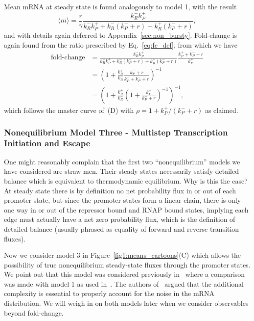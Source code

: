 Mean mRNA at steady state is found analogously to model 1, with the result
\begin{equation}
\langle m\rangle = \frac{r}{\gamma}
        \frac{k_R^- k_P^+}
        {k_R^- k_P^+ + k_R^- (k_P^- + r) + k_R^+ (k_P^- + r)},
\label{eq:model2_meanm}
\end{equation}
and with details again deferred to Appendix~\ref{sec:non_bursty}.
Fold-change is again found from the ratio prescribed by Eq.~\ref{eq:fc_def}, from
which we have
\begin{align}
\text{fold-change}
&=      \frac{k_R^- k_P^+}
        {k_R^- k_P^+ + k_R^- (k_P^- + r) + k_R^+ (k_P^- + r)}
        \frac{k_P^+ + k_P^- + r}{k_P^+}
\\
&=      \left(1 + \frac{k_R^+}{k_R^-}
                \frac{k_P^- + r}{k_P^+ + k_P^- + r}
        \right)^{-1}
\\
&=      \left(1 + \frac{k_R^+}{k_R^-}
        \left(1 + \frac{k_P^+}{k_P^- + r}\right)^{-1}
        \right)^{-1},
\end{align}
which follows the master curve of~(D) with $\rho = 1 +
k_P^+/(k_P^- + r)$ as claimed.

\subsubsection{Nonequilibrium Model Three - Multistep Transcription Initiation
and Escape}
One might reasonably complain that the first two ``nonequilibrium'' models we
have considered are straw men. Their steady states necessarily satisfy detailed
balance which is equivalent to thermodynamic equilibrium. Why is this the case?
At steady state there is by definition no net probability flux in or out of each
promoter state, but since the promoter states form a linear chain, there is only
one way in or out of the repressor bound and RNAP bound states, implying each
edge must actually have a net zero probability flux, which is the definition of
detailed balance (usually phrased as equality of forward and reverse transition
fluxes).

Now we consider model 3 in Figure~\ref{fig1:means_cartoons}(C) which allows the
possibility of true nonequilibrium steady-state fluxes through the promoter
states. We point out that this model was considered previously
in~\cite{Mitarai2015} where a comparison was made with model 1 as used
in~\cite{Jones2014}. The authors of~\cite{Mitarai2015} argued that the
additional complexity is essential to properly account for the noise in the mRNA
distribution. We will weigh in on both models later when we consider observables
beyond fold-change.

